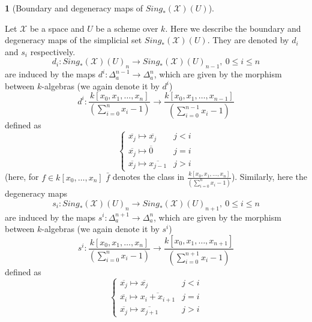 \documentclass[11pt, reqno]{amsart}
\theoremstyle{plain}
\theoremstyle{definition}
\newtheorem{remark}[thm]{Remark}
\newtheorem{point}[thm]{}
\newcommand{\Spec}{{\rm Spec \,}}
\newcommand{\sX}{{\mathcal X}}
\newcommand{\A}{{\mathbb A}}
\begin{document}
\begin{point}[Boundary and degeneracy maps of $Sing_*(\sX)(U)$]\label{maps of sing}~
	
Let $\sX$ be a space and $U$ be a scheme over $k$. Here we describe the boundary and degeneracy maps of the simplicial set $Sing_*(\sX)(U)$. They are denoted by $d_i$ and $s_i$ respectively. 
$$d_i: Sing_*(\mathcal{X})(U)_n \to Sing_*(\mathcal{X})(U)_{n-1}, \ 0 \leq i \leq n$$
are induced by the maps $d^i: \Delta^{n-1}_a \to \Delta^n_a$, which are given by the morphism between $k$-algebras (we again denote it by $d^i$)
$$d^i:  \frac{k[x_0, x_1,\dots, x_n]}{(\sum_{i=0}^n x_i - 1)} \to  \frac{k[x_0, x_1,\dots, x_{n-1}]}{(\sum_{i=0}^{n-1} x_i - 1)}$$
defined as 
\[
\begin{cases}
	\overline{x_j} \mapsto \overline{x_j} & j < i \\
	\overline{x_j} \mapsto \overline{0} & j = i \\
	\overline{x_j} \mapsto \overline{x_{j-1}} & j > i
\end{cases}
\]
(here, for $f \in k[x_0,\dots, x_n]$ $\bar{f}$ denotes the class in $\frac{k[x_0, x_1,\dots, x_n]}{(\sum_{i=0}^n x_i - 1)}$). 
Similarly, here the degeneracy maps 
$$s_i: Sing_*(\mathcal{X})(U)_n \to Sing_*(\mathcal{X})(U)_{n+1}, \ 0 \leq i \leq n$$
are induced by the maps $s^i: \Delta^{n+1}_a \to \Delta^n_a$, 
which are given by the morphism between $k$-algebras (we again denote it by $s^i$)
$$s^i:  \frac{k[x_0, x_1,\dots, x_n]}{(\sum_{i=0}^n x_i - 1)} \to  \frac{k[x_0, x_1,\dots, x_{n+1}]}{(\sum_{i=0}^{n+1} x_i - 1)}$$
defined as 
\[
\begin{cases}
	\overline{x_j} \mapsto \overline{x_j} & j < i \\
	\overline{x_i} \mapsto \overline{x_i + x_{i+1}} & j = i \\
	\overline{x_j} \mapsto \overline{x_{j+1}} & j > i
\end{cases}
\]
\end{point}
\end{document}
